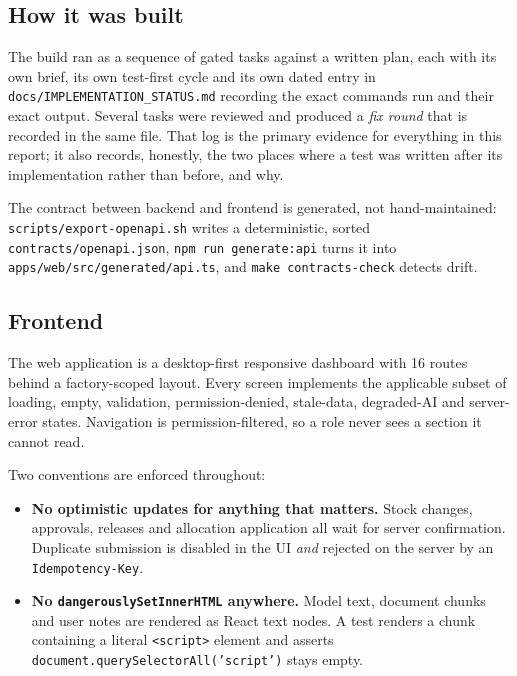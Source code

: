 \documentclass[11pt,a4paper]{article}
\begin{document}
\subsection{How it was built}

The build ran as a sequence of gated tasks against a written plan, each with its
own brief, its own test-first cycle and its own dated entry in
\texttt{docs/IMPLEMENTATION\_STATUS.md} recording the exact commands run and
their exact output. Several tasks were reviewed and produced a \emph{fix round}
that is recorded in the same file. That log is the primary evidence for
everything in this report; it also records, honestly, the two places where a
test was written after its implementation rather than before, and why.

The contract between backend and frontend is generated, not hand-maintained:
\texttt{scripts/export-openapi.sh} writes a deterministic, sorted
\texttt{contracts/openapi.json}, \texttt{npm run generate:api} turns it into
\texttt{apps/web/src/generated/api.ts}, and \texttt{make contracts-check}
detects drift.

\subsection{Frontend}

The web application is a desktop-first responsive dashboard with 16 routes
behind a factory-scoped layout. Every screen implements the applicable subset of
loading, empty, validation, permission-denied, stale-data, degraded-AI and
server-error states. Navigation is permission-filtered, so a role never sees a
section it cannot read.

Two conventions are enforced throughout:

\begin{itemize}
\item \textbf{No optimistic updates for anything that matters.} Stock changes,
  approvals, releases and allocation application all wait for server
  confirmation. Duplicate submission is disabled in the UI \emph{and} rejected
  on the server by an \texttt{Idempotency-Key}.
\item \textbf{No \texttt{dangerouslySetInnerHTML} anywhere.} Model text,
  document chunks and user notes are rendered as React text nodes. A test
  renders a chunk containing a literal \texttt{<script>} element and asserts
  \texttt{document.querySelectorAll('script')} stays empty.
\end{itemize}
\end{document}
